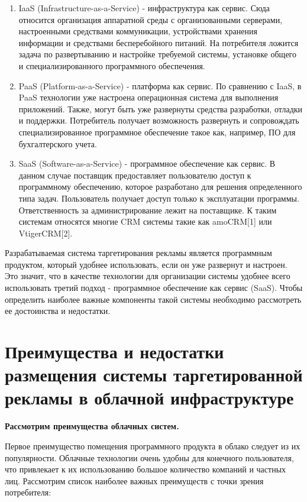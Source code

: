 \begin{enumerate}
	\item IaaS (Infrastructure-as-a-Service) - инфраструктура как сервис.
	Сюда относится организация аппаратной среды с организованными серверами, настроенными средствами коммуникации, устройствами хранения информации и средствами бесперебойного питаний. На потребителя ложится задача по развертыванию и настройке требуемой системы, установке общего и специализированного программного обеспечения.

	\item PaaS (Platform-as-a-Service) - платформа как сервис.
	По сравнению с IaaS, в PaaS технологии уже настроена операционная система для выполнения приложений. Также, могут быть уже развернуты средства разработки, отладки и поддержки. Потребитель получает возможность развернуть и сопровождать специализированное программное обеспечение такое как, например, ПО для бухгалтерского учета.

	\item SaaS (Software-as-a-Service) - программное обеспечение как сервис.
	В данном случае поставщик предоставляет пользователю доступ к программному обеспечению, которое разработано для решения определенного типа задач. Пользователь получает доступ только к эксплуатации программы. Ответственность за администрирование лежит на поставщике. К таким системам относятся многие CRM системы такие как amoCRM[1] или VtigerCRM[2].
\end{enumerate}

Разрабатываемая система таргетирования рекламы является программным продуктом, который удобнее использовать, если он уже развернут и настроен. Это значит, что в качестве технологии для организации системы удобнее всего использовать третий подход - программное обеспечение как сервис (SaaS). Чтобы определить наиболее важные компоненты такой системы необходимо рассмотреть ее достоинства и недостатки. 

\section{Преимущества и недостатки размещения системы таргетированной рекламы в облачной инфраструктуре}

\textbf{Рассмотрим преимущества облачных систем.}

Первое преимущество помещения программного продукта в облако следует из их популярности. Облачные технологии очень удобны для конечного пользователя, что привлекает к их использованию большое количество компаний и частных лиц. Рассмотрим список наиболее важных преимуществ с точки зрения потребителя:


